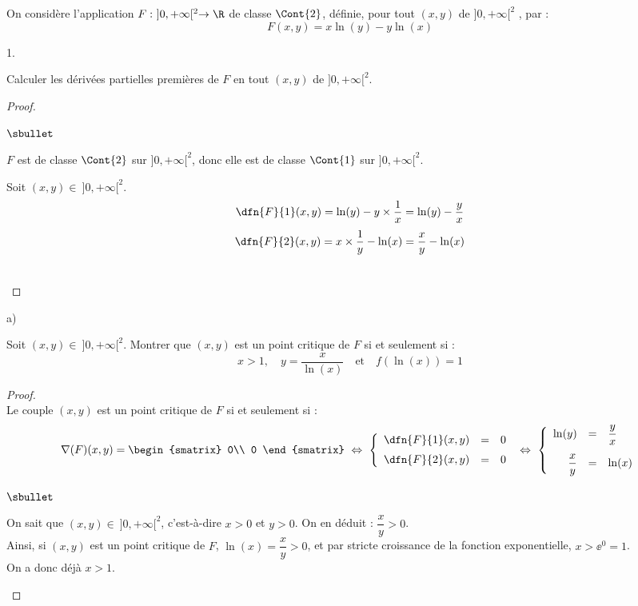 \noindent
On considère l'application $F: \ ]0,+\infty[^2 \to \R$ de 
classe $\Cont{2}$, définie, pour tout $(x,y)$ de $]0,+\infty[^2$ , par 
: 
\[
F(x,y)=x\ln(y)-y\ln(x)
\]
\begin{noliste}{1.}
  \setlength{\itemsep}{2mm} %
  \setcounter{enumi}{5}
\item Calculer les dérivées partielles premières de $F$ en tout
  $(x,y)$ de $]0,+\infty[^2$.

  \begin{proof}~
    \begin{noliste}{$\sbullet$}
    \item $F$ est de classe $\Cont{2}$ sur $]0,+\infty[^2$, donc elle
      est de classe $\Cont{1}$ sur $]0,+\infty[^2$.
      
    \item Soit $(x,y)\in \ ]0,+\infty[^2$.
      \[
      \dfn{F}{1}(x,y)=\ln(y)-y\times \dfrac{1}{x} = \ln(y) - \dfrac{y}{x}
      \]
      \[
      \dfn{F}{2}(x,y)=x\times \dfrac{1}{y} -\ln(x) = \dfrac{x}{y} - \ln(x)
      \]
    \end{noliste}
    \conc{$\forall (x,y)\in \ ]0,+\infty[^2$, $\dfn{F}{1}(x,y) = \ln(y) - 
      \dfrac{y}{x}$ \ et \ $\dfn{F}{2}(x,y) = \dfrac{x}{y} -
      \ln(x)$}~\\[-1cm] 
  \end{proof}
  

\item
\begin{noliste}{a)}
\item Soit $(x,y)\in \ ]0,+\infty[^2$. Montrer que $(x,y)$ est un point 
critique de $F$ si et seulement si :
\[
x > 1, \quad y=\dfrac{x}{\ln(x)} \quad \text{et} \quad 
f\left(\ln(x)\right)=1
\]

\begin{proof}~\\
 Le couple $(x,y)$ est un point critique de $F$ si et seulement si :
 \[
   \nabla(F)(x,y) = 
   \begin{smatrix}
    0\\
    0
   \end{smatrix}
   \ \Leftrightarrow \
   \left\{
   \begin{array}{rcl}
    \dfn{F}{1}(x,y) &=& 0\\[.2cm]
    \dfn{F}{2}(x,y) &=& 0
   \end{array}
   \right.
   \ \Leftrightarrow \
   \left\{
   \begin{array}{rcl}
    \ln(y) &=& \dfrac{y}{x}\\[.4cm]
    \dfrac{x}{y} &=& \ln(x)
   \end{array}
   \right.
 \]
 \begin{noliste}{$\sbullet$}
 \item On sait que $(x,y)\in \ ]0,+\infty[^2$, c'est-à-dire $x>0$ et
   $y>0$. On en déduit : $\dfrac{x}{y} > 0$.\\
   Ainsi, si $(x,y)$ est un point critique de $F$,
   $\ln(x)=\dfrac{x}{y} >0$, et par stricte croissance de la
   fonction exponentielle, $x>\ee^0=1$.\\
   On a donc déjà $x>1$.
  

\end{noliste}
\end{proof}
\end{noliste}
\end{noliste}
